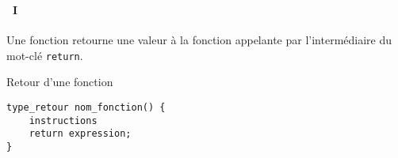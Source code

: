 \begin{frame}[containsverbatim]
  \frametitle{\secname}
  \framesubtitle{\subsecname~I}

  Une fonction retourne une valeur à la fonction appelante par l'intermédiaire du mot-clé \verb|return|.
  \vspace{0.5cm}
  \begin{block}{Retour d'une fonction}
    \begin{verbatim}
type_retour nom_fonction() {
    instructions
    return expression;
}
    \end{verbatim}
  \end{block}
\end{frame}

